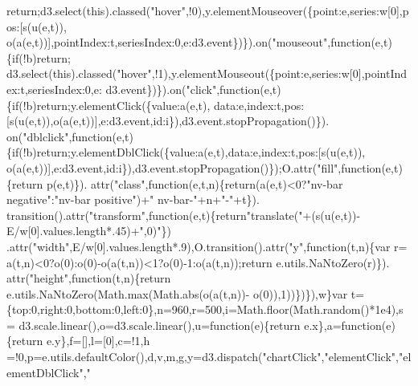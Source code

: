 \begin{DoxyCode}
{      return};d3.select(\textcolor{keyword}{this}).classed(\textcolor{stringliteral}{"hover"},!0),y.elementMouseover(\{point:e,series:w[0],pos:[s(u(e,t)),
      o(a(e,t))],pointIndex:t,seriesIndex:0,e:d3.event\})\}).on(\textcolor{stringliteral}{"mouseout"},\textcolor{keyword}{function}(e,t)\{\textcolor{keywordflow}{if}(!b)\textcolor{keywordflow}{return};
      d3.select(\textcolor{keyword}{this}).classed(\textcolor{stringliteral}{"hover"},!1),y.elementMouseout(\{point:e,series:w[0],pointIndex:t,seriesIndex:0,e:
      d3.event\})\}).on(\textcolor{stringliteral}{"click"},\textcolor{keyword}{function}(e,t)\{\textcolor{keywordflow}{if}(!b)\textcolor{keywordflow}{return};y.elementClick(\{value:a(e,t),
      data:e,index:t,pos:[s(u(e,t)),o(a(e,t))],e:d3.event,\textcolor{keywordtype}{id}:i\}),d3.event.stopPropagation()\}).
      on(\textcolor{stringliteral}{"dblclick"},\textcolor{keyword}{function}(e,t)\{\textcolor{keywordflow}{if}(!b)\textcolor{keywordflow}{return};y.elementDblClick(\{value:a(e,t),data:e,index:t,pos:[s(u(e,t)),
      o(a(e,t))],e:d3.event,\textcolor{keywordtype}{id}:i\}),d3.event.stopPropagation()\});O.attr(\textcolor{stringliteral}{"fill"},\textcolor{keyword}{function}(e,t)\{\textcolor{keywordflow}{return} p(e,t)\}).
      attr(\textcolor{stringliteral}{"class"},\textcolor{keyword}{function}(e,t,n)\{\textcolor{keywordflow}{return}(a(e,t)<0?\textcolor{stringliteral}{"nv-bar negative"}:\textcolor{stringliteral}{"nv-bar positive"})+\textcolor{stringliteral}{" nv-bar-"}+n+\textcolor{stringliteral}{"-"}+t\}).
      transition().attr(\textcolor{stringliteral}{"transform"},\textcolor{keyword}{function}(e,t)\{\textcolor{keywordflow}{return}\textcolor{stringliteral}{"translate("}+(s(u(e,t))-E/w[0].values.length*.45)+\textcolor{stringliteral}{",0)"}\})
      .attr(\textcolor{stringliteral}{"width"},E/w[0].values.length*.9),O.transition().attr(\textcolor{stringliteral}{"y"},\textcolor{keyword}{function}(t,n)\{var r=
      a(t,n)<0?o(0):o(0)-o(a(t,n))<1?o(0)-1:o(a(t,n));\textcolor{keywordflow}{return} e.utils.NaNtoZero(r)\}).
      attr(\textcolor{stringliteral}{"height"},\textcolor{keyword}{function}(t,n)\{\textcolor{keywordflow}{return} e.utils.NaNtoZero(Math.max(Math.abs(o(a(t,n))-
      o(0)),1))\})\}),w\}var t=\{top:0,right:0,bottom:0,left:0\},n=960,r=500,i=Math.floor(Math.random()*1e4),s=
      d3.scale.linear(),o=d3.scale.linear(),u=\textcolor{keyword}{function}(e)\{\textcolor{keywordflow}{return} e.x\},a=\textcolor{keyword}{function}(e)\{\textcolor{keywordflow}{return} e.y\},f=[],l=[0],c=!1,h
      =!0,p=e.utils.defaultColor(),d,v,m,g,y=d3.dispatch(\textcolor{stringliteral}{"chartClick"},\textcolor{stringliteral}{"elementClick"},\textcolor{stringliteral}{"elementDblClick"},\textcolor{stringliteral}{"
}
\end{DoxyCode}
